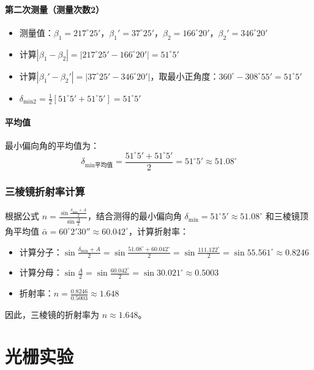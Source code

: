 \documentclass[11pt]{article}
\begin{document}
\paragraph{第二次测量（测量次数2）}

\begin{itemize}[itemsep=0.3ex]
\item 测量值：\(\beta_1 = 217^\circ25'\)，\(\beta_1' = 37^\circ25'\)，\(\beta_2 = 166^\circ20'\)，\(\beta_2' = 346^\circ20'\)
\item 计算\(|\beta_1 - \beta_2| = |217^\circ25' - 166^\circ20'| = 51^\circ5'\)
\item 计算\(|\beta_1' - \beta_2'| = |37^\circ25' - 346^\circ20'|\)，取最小正角度：\(360^\circ - 308^\circ55' = 51^\circ5'\)
\item \(\delta_{\text{min2}} = \frac{1}{2}\left[51^\circ5' + 51^\circ5'\right] = 51^\circ5'\)
\end{itemize}

\paragraph{平均值}

最小偏向角的平均值为：
\[
\delta_{\text{min平均值}} = \frac{51^\circ5' + 51^\circ5'}{2} = 51^\circ5' \approx 51.08^\circ
\]

\subsubsection{三棱镜折射率计算}

根据公式 \(n = \frac{\sin \frac{\delta_{\text{min}} + A}{2}}{\sin \frac{A}{2}}\)，结合测得的最小偏向角 \(\delta_{\text{min}} = 51^\circ5' \approx 51.08^\circ\) 和三棱镜顶角平均值 \(\bar{\alpha} = 60^\circ2'30'' \approx 60.042^\circ\)，计算折射率：

\begin{itemize}[itemsep=0.3ex]
\item 计算分子：\(\sin \frac{\delta_{\text{min}} + A}{2} = \sin \frac{51.08^\circ + 60.042^\circ}{2} = \sin \frac{111.122^\circ}{2} = \sin 55.561^\circ \approx 0.8246\)
\item 计算分母：\(\sin \frac{A}{2} = \sin \frac{60.042^\circ}{2} = \sin 30.021^\circ \approx 0.5003\)
\item 折射率：\(n = \frac{0.8246}{0.5003} \approx 1.648\)
\end{itemize}

因此，三棱镜的折射率为 \(n \approx 1.648\)。

\section{光栅实验}
\end{document}
